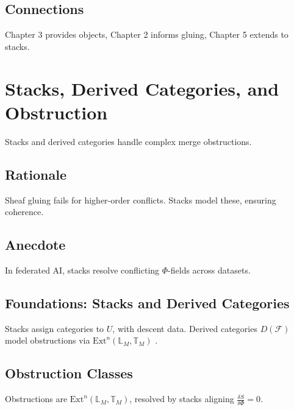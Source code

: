 \documentclass[12pt]{article}
\begin{document}
\subsection{Connections}
Chapter 3 provides objects, Chapter 2 informs gluing, Chapter 5 extends to stacks.

\begin{center}
\end{center}

\section{Stacks, Derived Categories, and Obstruction}
\label{sec:chapter5}

Stacks and derived categories handle complex merge obstructions.

\subsection{Rationale}
Sheaf gluing fails for higher-order conflicts. Stacks model these, ensuring coherence.

\subsection{Anecdote}
In federated AI, stacks resolve conflicting $\Phi$-fields across datasets.

\subsection{Foundations: Stacks and Derived Categories}
Stacks assign categories to $U$, with descent data. Derived categories $D(\mathcal{F})$ model obstructions via $\mathrm{Ext}^n(\mathbb{L}_M, \mathbb{T}_M)$ \cite{illusie1971complexe}.

\subsection{Obstruction Classes}
Obstructions are $\mathrm{Ext}^n(\mathbb{L}_M, \mathbb{T}_M)$, resolved by stacks aligning $\frac{\delta S}{\delta \Phi} = 0$.
\end{document}
